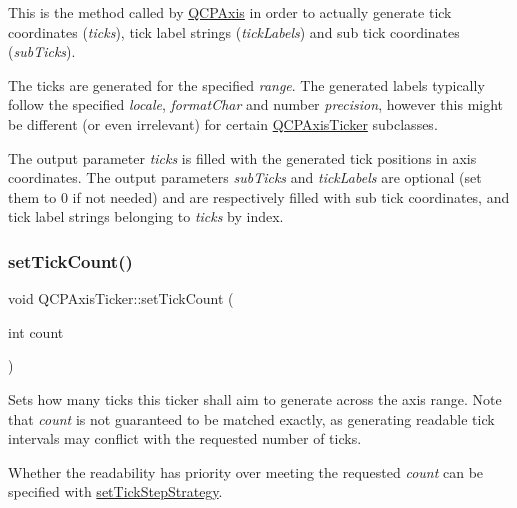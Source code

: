 This is the method called by \hyperlink{classQCPAxis}{Q\+C\+P\+Axis} in order to actually generate tick coordinates ({\itshape ticks}), tick label strings ({\itshape tick\+Labels}) and sub tick coordinates ({\itshape sub\+Ticks}).

The ticks are generated for the specified {\itshape range}. The generated labels typically follow the specified {\itshape locale}, {\itshape format\+Char} and number {\itshape precision}, however this might be different (or even irrelevant) for certain \hyperlink{classQCPAxisTicker}{Q\+C\+P\+Axis\+Ticker} subclasses.

The output parameter {\itshape ticks} is filled with the generated tick positions in axis coordinates. The output parameters {\itshape sub\+Ticks} and {\itshape tick\+Labels} are optional (set them to 0 if not needed) and are respectively filled with sub tick coordinates, and tick label strings belonging to {\itshape ticks} by index. \mbox{\label{classQCPAxisTicker_a47752abba8293e6dc18491501ae34008}} 
\subsubsection{\texorpdfstring{set\+Tick\+Count()}{setTickCount()}}
{\footnotesize\ttfamily void Q\+C\+P\+Axis\+Ticker\+::set\+Tick\+Count (\begin{DoxyParamCaption}\item[{int}]{count }\end{DoxyParamCaption})}

Sets how many ticks this ticker shall aim to generate across the axis range. Note that {\itshape count} is not guaranteed to be matched exactly, as generating readable tick intervals may conflict with the requested number of ticks.

Whether the readability has priority over meeting the requested {\itshape count} can be specified with \hyperlink{classQCPAxisTicker_a73b1d847c1a12159af6bfda4ebebe7d5}{set\+Tick\+Step\+Strategy}. \mbox{\label{classQCPAxisTicker_ab509c7e500293bf66a8409f0d7c23943}} 
